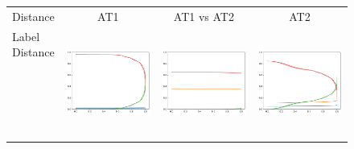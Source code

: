 \begin{figure}
\begin{tabular}{lccc}
    Distance & AT1                                                                         & AT1 vs AT2                                                                    & AT2                                                                         \\
\shortstack{Label\\Distance\\\text{ }\\\text{ }\\\text{ }\\\text{ }\\\text{ }\\\text{ }}       & \includegraphics[width=.25\linewidth]{code/img/operation_count_ld_AT1.pdf}  & \includegraphics[width=.25\linewidth]{code/img/operation_count_ld_AT1-2.pdf}  & \includegraphics[width=.25\linewidth]{code/img/operation_count_ld_AT2.pdf}  \\

\end{tabular}
\end{figure}
